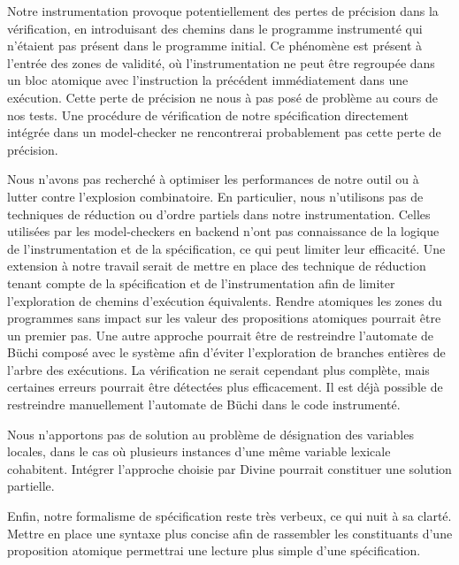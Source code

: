 Notre instrumentation provoque potentiellement des pertes de précision dans la
vérification, en introduisant des chemins dans le programme instrumenté qui
n'étaient pas présent dans le programme initial. Ce phénomène est présent à
l'entrée des zones de validité, où l'instrumentation ne peut être regroupée dans
un bloc atomique avec l'instruction la précédent immédiatement dans une
exécution. Cette perte de précision ne nous à pas posé de problème au cours de
nos tests. Une procédure de vérification de notre spécification directement
intégrée dans un model-checker ne rencontrerai probablement pas cette perte de
précision.

Nous n'avons pas recherché à optimiser les performances de notre outil ou à
lutter contre l'explosion combinatoire. En particulier, nous n'utilisons pas de
techniques de réduction ou d'ordre partiels dans notre instrumentation. Celles
utilisées par les model-checkers en backend n'ont pas connaissance de la logique
de l'instrumentation et de la spécification, ce qui peut limiter leur
efficacité. Une extension à notre travail serait de mettre en place des
technique de réduction tenant compte de la spécification et de l'instrumentation
afin de limiter l'exploration de chemins d'exécution équivalents. Rendre
atomiques les zones du programmes sans impact sur les valeur des propositions
atomiques pourrait être un premier pas. Une autre approche pourrait être de
restreindre l'automate de Büchi composé avec le système afin d'éviter
l'exploration de branches entières de l'arbre des exécutions. La vérification ne
serait cependant plus complète, mais certaines erreurs pourrait être détectées
plus efficacement. Il est déjà possible de restreindre manuellement l'automate
de Büchi dans le code instrumenté.

Nous n'apportons pas de solution au problème de désignation des variables
locales, dans le cas où plusieurs instances d'une même variable lexicale
cohabitent. Intégrer l'approche choisie par Divine\cite{Divine_LTL} pourrait
constituer une solution partielle.

Enfin, notre formalisme de spécification reste très verbeux, ce qui nuit à sa
clarté. Mettre en place une syntaxe plus concise afin de rassembler les
constituants d'une proposition atomique permettrai une lecture plus simple d'une
spécification.